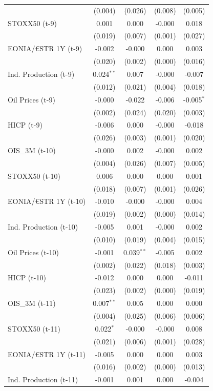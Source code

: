 \begin{longtable}[t]{lcccc}
 & (0.004) & (0.026) & (0.008) & (0.005)\\
STOXX50 (t-9) & 0.001 & 0.000 & -0.000 & 0.018\\
 & (0.019) & (0.007) & (0.001) & (0.027)\\
EONIA/€STR 1Y (t-9) & -0.002 & -0.000 & 0.000 & 0.003\\
 & (0.020) & (0.002) & (0.000) & \vphantom{1} (0.016)\\
Ind. Production (t-9) & 0.024$^{**}$ & 0.007 & -0.000 & -0.007\\
 & (0.012) & (0.021) & (0.004) & (0.018)\\
Oil Prices (t-9) & -0.000 & -0.022 & -0.006 & -0.005$^{*}$\\
 & (0.002) & (0.024) & (0.020) & (0.003)\\
HICP (t-9) & -0.006 & 0.000 & -0.000 & -0.018\\
 & (0.026) & (0.003) & (0.001) & (0.020)\\
OIS\_3M (t-10) & -0.000 & 0.002 & -0.000 & 0.002\\
 & (0.004) & (0.026) & (0.007) & (0.005)\\
STOXX50 (t-10) & 0.006 & 0.000 & 0.000 & 0.001\\
 & (0.018) & (0.007) & (0.001) & (0.026)\\
EONIA/€STR 1Y (t-10) & -0.010 & -0.000 & -0.000 & 0.004\\
 & (0.019) & (0.002) & (0.000) & (0.014)\\
Ind. Production (t-10) & -0.005 & 0.001 & -0.000 & 0.002\\
 & (0.010) & (0.019) & (0.004) & (0.015)\\
Oil Prices (t-10) & -0.001 & 0.039$^{**}$ & -0.005 & 0.002\\
 & (0.002) & (0.022) & (0.018) & (0.003)\\
HICP (t-10) & -0.012 & 0.000 & 0.000 & -0.011\\
 & (0.023) & (0.002) & (0.000) & (0.019)\\
OIS\_3M (t-11) & 0.007$^{**}$ & 0.005 & 0.000 & 0.000\\
 & (0.004) & (0.025) & (0.006) & (0.006)\\
STOXX50 (t-11) & 0.022$^{*}$ & -0.000 & -0.000 & 0.008\\
 & (0.021) & (0.006) & (0.001) & (0.028)\\
EONIA/€STR 1Y (t-11) & -0.005 & 0.000 & 0.000 & 0.003\\
 & (0.016) & (0.002) & (0.000) & (0.013)\\
Ind. Production (t-11) & -0.001 & 0.001 & 0.000 & -0.004\\

\end{longtable}

